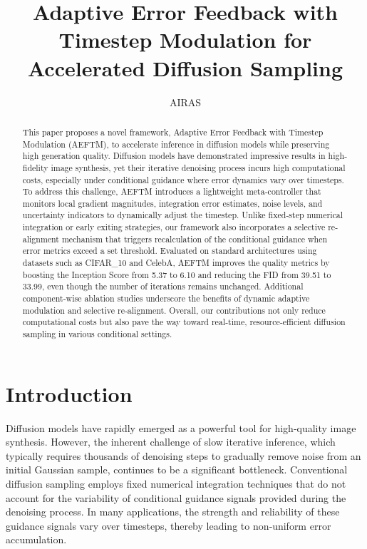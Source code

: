 \documentclass{article} %
\title{Adaptive Error Feedback with Timestep Modulation for Accelerated Diffusion Sampling}
\author{AIRAS}
\begin{document}
\maketitle

\begin{abstract}
This paper proposes a novel framework, Adaptive Error Feedback with Timestep Modulation (AEFTM), to accelerate inference in diffusion models while preserving high generation quality. Diffusion models have demonstrated impressive results in high‐fidelity image synthesis, yet their iterative denoising process incurs high computational costs, especially under conditional guidance where error dynamics vary over timesteps. To address this challenge, AEFTM introduces a lightweight meta‐controller that monitors local gradient magnitudes, integration error estimates, noise levels, and uncertainty indicators to dynamically adjust the timestep. Unlike fixed‐step numerical integration or early exiting strategies, our framework also incorporates a selective re‐alignment mechanism that triggers recalculation of the conditional guidance when error metrics exceed a set threshold. Evaluated on standard architectures using datasets such as CIFAR\_10 and CelebA, AEFTM improves the quality metrics by boosting the Inception Score from 5.37 to 6.10 and reducing the FID from 39.51 to 33.99, even though the number of iterations remains unchanged. Additional component‐wise ablation studies underscore the benefits of dynamic adaptive modulation and selective re‐alignment. Overall, our contributions not only reduce computational costs but also pave the way toward real‐time, resource‐efficient diffusion sampling in various conditional settings.
\end{abstract}

\section{Introduction}
\label{sec:intro}
Diffusion models have rapidly emerged as a powerful tool for high‐quality image synthesis. However, the inherent challenge of slow iterative inference, which typically requires thousands of denoising steps to gradually remove noise from an initial Gaussian sample, continues to be a significant bottleneck. Conventional diffusion sampling employs fixed numerical integration techniques that do not account for the variability of conditional guidance signals provided during the denoising process. In many applications, the strength and reliability of these guidance signals vary over timesteps, thereby leading to non‐uniform error accumulation.
\end{document}
